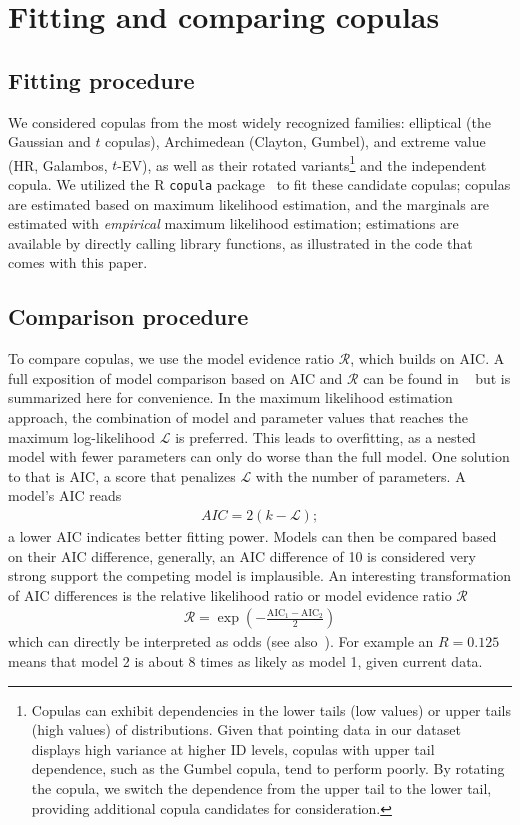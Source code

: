 \documentclass[acmlarge, manuscript,review]{acmart}
\begin{document}
\section{Fitting and comparing copulas\label{app:copula_method}}
\subsection{Fitting procedure\label{app:copula:fit}}
We considered copulas from the most widely recognized families: elliptical (\eg the Gaussian and $t$ copulas), Archimedean (\eg Clayton, Gumbel), and extreme value (\eg HR, Galambos, $t$-EV), as well as their rotated variants\footnote{Copulas can exhibit dependencies in the lower tails (low values) or upper tails (high values) of distributions. Given that pointing data in our dataset displays high variance at higher ID levels, copulas with upper tail dependence, such as the Gumbel copula, tend to perform poorly. By rotating the copula, we switch the dependence from the upper tail to the lower tail, providing additional copula candidates for consideration.} and the independent copula.
We utilized the R \texttt{copula} package~\cite{yan2007} to fit these candidate copulas; copulas are estimated based on maximum likelihood estimation, and the marginals are estimated with \textit{empirical} maximum likelihood estimation; estimations are available by directly calling library functions, as illustrated in the code that comes with this paper. 

\subsection{Comparison procedure\label{app:copula:compare}}
To compare copulas, we use the model evidence ratio $\mathcal{R}$, which builds on AIC. A full exposition of model comparison based on AIC and $\mathcal{R}$ can be found in ~\cite{anderson2004} but is summarized here for convenience. In the maximum likelihood estimation approach, the combination of model and parameter values that reaches the maximum log-likelihood $\mathcal{L}$ is preferred. This leads to overfitting, as a nested model with fewer parameters can only do worse than the full model. One solution to that is AIC, a score that penalizes $\mathcal{L}$ with the number of parameters. A model's AIC reads 
\begin{align}
	AIC = 2(k - \mathcal{L});
\end{align}
a lower AIC indicates better fitting power. Models can then be compared based on their AIC difference, generally, an AIC difference of 10 is considered very strong support \ie the competing model is implausible. An interesting transformation of AIC differences is the relative likelihood ratio or model evidence ratio $\mathcal{R}$
\begin{align}
	\mathcal{R} = \exp \left(- \frac{\text{AIC}_1 - \text{AIC}_2}{2} \right)
\end{align}
which can directly be interpreted as odds (see also~\cite{wagenmakers2004}). For example an $R = 0.125$ means that model 2 is about 8 times as likely as model 1, given current data.
\end{document}
